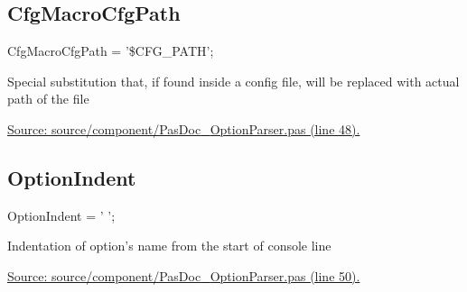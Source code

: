 \documentclass{report}
\newif\ifpdf
\begin{document}
\subsection*{CfgMacroCfgPath}
\fi
\label{PasDoc_OptionParser-CfgMacroCfgPath}
\begin{list}{}{
\setlength{\itemindent}{0cm}
\setlength{\listparindent}{0cm}
\setlength{\leftmargin}{\evensidemargin}
\addtolength{\leftmargin}{\tmplength}
\settowidth{\labelsep}{X}
\addtolength{\leftmargin}{\labelsep}
\setlength{\labelwidth}{\tmplength}
}
\item[\textbf{Declaration}\hfill]
\ifpdf
\begin{flushleft}
\fi
\begin{ttfamily}
CfgMacroCfgPath = '{\$}CFG{\_}PATH';\end{ttfamily}

\ifpdf
\end{flushleft}
\fi

\par
\item[\textbf{Description}]
Special substitution that, if found inside a config file, will be replaced with actual path of the file\par
\href{https://github.com/pasdoc/pasdoc/blob/master/source/component/PasDoc_OptionParser.pas#L48}{Source: source/component/PasDoc{\_}OptionParser.pas (line 48).}

\end{list}
\ifpdf
\subsection*{\large{\textbf{OptionIndent}}\normalsize\hspace{1ex}\hrulefill}
\else
\subsection*{OptionIndent}
\fi
\label{PasDoc_OptionParser-OptionIndent}
\begin{list}{}{
\setlength{\itemindent}{0cm}
\setlength{\listparindent}{0cm}
\setlength{\leftmargin}{\evensidemargin}
\addtolength{\leftmargin}{\tmplength}
\settowidth{\labelsep}{X}
\addtolength{\leftmargin}{\labelsep}
\setlength{\labelwidth}{\tmplength}
}
\item[\textbf{Declaration}\hfill]
\ifpdf
\begin{flushleft}
\fi
\begin{ttfamily}
OptionIndent = '  ';\end{ttfamily}

\ifpdf
\end{flushleft}
\fi

\par
\item[\textbf{Description}]
Indentation of option's name from the start of console line\par
\href{https://github.com/pasdoc/pasdoc/blob/master/source/component/PasDoc_OptionParser.pas#L50}{Source: source/component/PasDoc{\_}OptionParser.pas (line 50).}

\end{list}
\ifpdf
\end{document}
